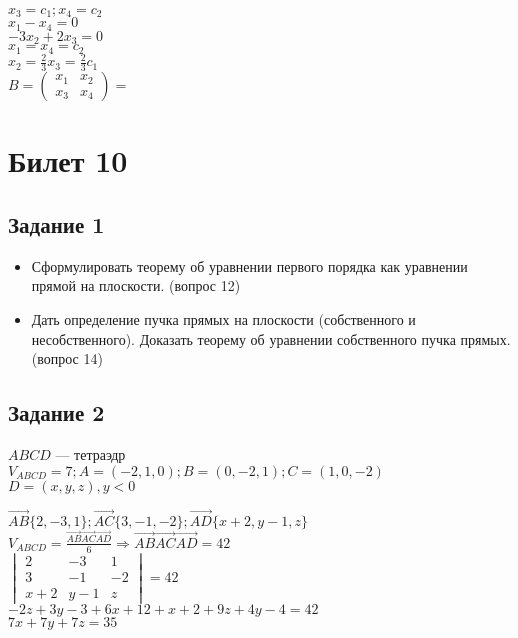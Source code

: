 \documentclass[a4paper]{article}
\theoremstyle{definition}
\theoremstyle{plain}
\begin{document}
$
x_{3} = c_{1}; x_{4} = c_{2}
$\\
$
x_{1} - x_{4} = 0
$\\
$
-3x_{2} + 2x_{3} = 0
$\\
$
x_{1} = x_{4} = c_{2}
$\\
$
x_{2} = \frac{2}{3}x_{3} = \frac{2}{3}c_{1}
$\\
$
B =
\begin{pmatrix}
  x_{1} & x_{2}\\
  x_{3} & x_{4}
\end{pmatrix}
=
$

\section*{Билет 10}
\subsection*{Задание 1}
\begin{itemize}
\item
Сформулировать теорему об уравнении первого порядка как уравнении прямой на плоскости.
(вопрос 12)
\item
Дать определение пучка прямых на плоскости (собственного и несобственного).
Доказать теорему об уравнении собственного пучка прямых.
(вопрос 14)
\end{itemize}
\subsection*{Задание 2}
$ABCD$ --- тетраэдр\\
$V_{ABCD} = 7; A = (-2,1,0); B = (0, -2, 1); C = (1, 0, -2)$\\
$D = (x, y, z), y < 0$

$\vec{AB}\{2, -3, 1\}; \vec{AC}\{3, -1, -2\}; \vec{AD}\{x + 2, y - 1, z\}$\\
$V_{ABCD} = \frac{\vec{AB}\vec{AC}\vec{AD}}{6} \Rightarrow \vec{AB}\vec{AC}\vec{AD} = 42$\\
$\begin{vmatrix}
  2 & -3 & 1\\
  3 & -1 & -2\\
  x+2 & y-1 & z
\end{vmatrix}
= 42$\\
$-2z + 3y - 3 + 6x + 12 + x + 2 + 9z + 4y - 4 = 42$\\
$7x + 7y + 7z = 35$\\
\end{document}
